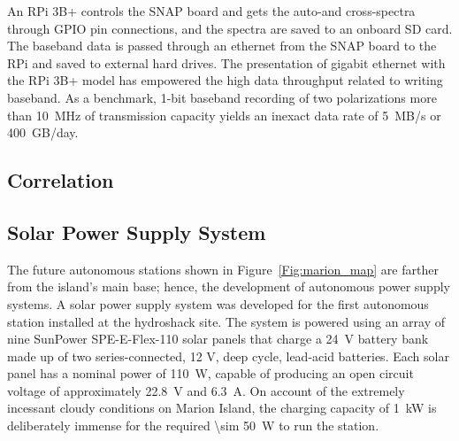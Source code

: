 An RPi 3B+ controls the SNAP board and gets the auto-and cross-spectra through GPIO pin connections, and the spectra are saved to an onboard SD card. The baseband data is passed through an ethernet from the SNAP board to the RPi and saved to external hard drives. The presentation of gigabit ethernet with the RPi 3B+ model has empowered the high data throughput related to writing baseband. As a benchmark, 1-bit baseband recording of two polarizations more than \SI{10}{\mega\hertz} of transmission capacity yields an inexact data rate of 5~MB/s or 400~GB/day.

\subsection{Correlation}

\subsection{Solar Power Supply System}

The future autonomous stations shown in Figure~\ref{Fig:marion_map} are farther from the island's main base; hence, the development of autonomous power supply systems. A solar power supply system was developed for the first autonomous station installed at the hydroshack site. The system is powered using an array of nine SunPower SPE-E-Flex-110 solar panels that charge a \SI{24}{\volt} battery bank made up of two series-connected, 12 V, deep cycle, lead-acid batteries. Each solar panel has a nominal power of \SI{110}{\watt}, capable of producing an open circuit voltage of approximately \SI{22.8}{\volt} and \SI{6.3}{\ampere}. On account of the extremely incessant cloudy conditions on Marion Island, the charging capacity of \SI{1}{\kilo\watt} is deliberately immense for the required \SI{\sim 50}{\watt} to run the station.

